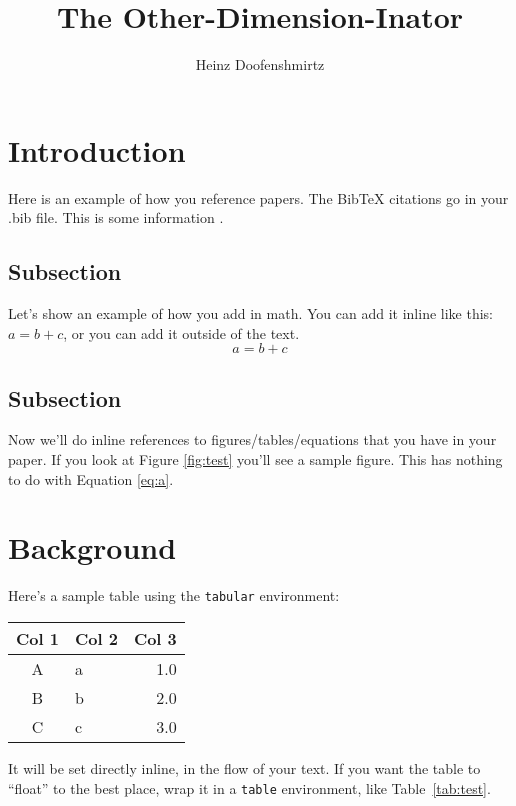 \documentclass{ndreureport}
\author{Heinz Doofenshmirtz}
\title{The Other-Dimension-Inator}
\begin{document}
\maketitle


\begin{abstract}
    \lipsum[1]
\end{abstract}


\section{Introduction}

Here is an example of how you reference papers. The BibTeX citations go in your
.bib file. This is some information \cite{sample2021}.

\subsection{Subsection}

\lipsum[2]

Let's show an example of how you add in math. You can add it inline like this:
$a = b + c$, or you can add it outside of the text.
\begin{equation}
    a = b + c
    \label{eq:a}
\end{equation}

\subsection{Subsection}

\lipsum[3]

Now we'll do inline references to figures/tables/equations that you have in your
paper. If you look at Figure \ref{fig:test} you'll see a sample figure. This has
nothing to do with Equation \ref{eq:a}.

\section{Background}

Here's a sample table using the \texttt{tabular} environment:
\begin{center}
    \begin{tabular}{c|l|r}
        Col 1 & Col 2 & Col 3 \\ \hline
        A & a & 1.0 \\
        B & b & 2.0 \\
        C & c & 3.0
    \end{tabular}
\end{center}
It will be set directly inline, in the flow of your text. If you want the table
to ``float'' to the best place, wrap it in a \texttt{table} environment, like
Table~\ref{tab:test}.
\end{document}
